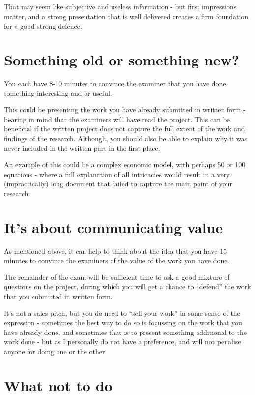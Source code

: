 \documentclass[
]{book}
\begin{document}
That may seem like subjective and useless information - but first impressions matter, and a strong presentation that is well delivered creates a firm foundation for a good strong defence.

\hypertarget{something-old-or-something-new}{%
\section{Something old or something new?}\label{something-old-or-something-new}}

You each have 8-10 minutes to convince the examiner that you have done something interesting and or useful.

This could be presenting the work you have already submitted in written form - bearing in mind that the examiners will have read the project. This can be beneficial if the written project does not capture the full extent of the work and findings of the research. Although, you should also be able to explain why it was never included in the written part in the first place.

An example of this could be a complex economic model, with perhaps 50 or 100 equations - where a full explanation of all intricacies would result in a very (impractically) long document that failed to capture the main point of your research.

\hypertarget{its-about-communicating-value}{%
\section{It's about communicating value}\label{its-about-communicating-value}}

As mentioned above, it can help to think about the idea that you have 15 minutes to convince the examiners of the value of the work you have done.

The remainder of the exam will be sufficient time to ask a good mixture of questions on the project, during which you will get a chance to ``defend'' the work that you submitted in written form.

It's not a sales pitch, but you do need to ``sell your work'' in some sense of the expression - sometimes the best way to do so is focussing on the work that you have already done, and sometimes that is to present something additional to the work done - but as I personally do not have a preference, and will not penalise anyone for doing one or the other.

\hypertarget{what-not-to-do}{%
\section{What not to do}\label{what-not-to-do}}
\end{document}
